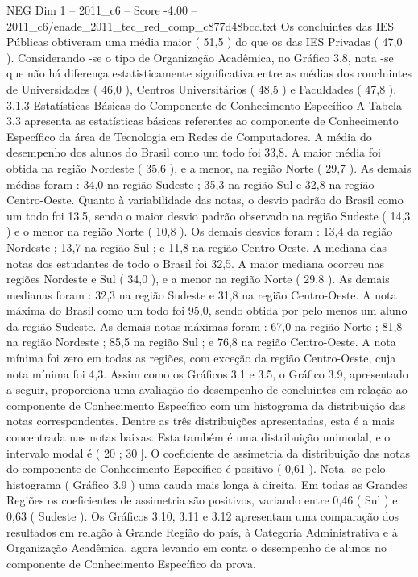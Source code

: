 \begin{textsample}{NEG Dim 1 – 2011\_c6 – Score -4.00 – 2011\_c6/enade\_2011\_tec\_red\_comp\_c877d48bcc.txt}
Os concluintes das IES Públicas obtiveram uma média maior ( 51,5 ) do que os das IES Privadas ( 47,0 ).
Considerando -se o tipo de Organização Acadêmica, no Gráfico 3.8, nota -se que não há diferença estatisticamente significativa entre as médias dos concluintes de Universidades ( 46,0 ), Centros Universitários ( 48,5 ) e Faculdades ( 47,8 ). 3.1.3 Estatísticas Básicas do Componente de Conhecimento Específico A Tabela 3.3 apresenta as estatísticas básicas referentes ao componente de Conhecimento Específico da área de Tecnologia em Redes de Computadores.
A média do desempenho dos alunos do Brasil como um todo foi 33,8.
A maior média foi obtida na região Nordeste ( 35,6 ), e a menor, na região Norte ( 29,7 ).
As demais médias foram : 34,0 na região Sudeste ; 35,3 na região Sul e 32,8 na região Centro-Oeste.
Quanto à variabilidade das notas, o desvio padrão do Brasil como um todo foi 13,5, sendo o maior desvio padrão observado na região Sudeste ( 14,3 ) e o menor na região Norte ( 10,8 ).
Os demais desvios foram : 13,4 da região Nordeste ; 13,7 na região Sul ; e 11,8 na região Centro-Oeste.
A mediana das notas dos estudantes de todo o Brasil foi 32,5.
A maior mediana ocorreu nas regiões Nordeste e Sul ( 34,0 ), e a menor na região Norte ( 29,8 ).
As demais medianas foram : 32,3 na região Sudeste e 31,8 na região Centro-Oeste.
A nota máxima do Brasil como um todo foi 95,0, sendo obtida por pelo menos um aluno da região Sudeste.
As demais notas máximas foram : 67,0 na região Norte ; 81,8 na região Nordeste ; 85,5 na região Sul ; e 76,8 na região Centro-Oeste.
A nota mínima foi zero em todas as regiões, com exceção da região Centro-Oeste, cuja nota mínima foi 4,3.
Assim como os Gráficos 3.1 e 3.5, o Gráfico 3.9, apresentado a seguir, proporciona uma avaliação do desempenho de concluintes em relação ao componente de Conhecimento Específico com um histograma da distribuição das notas correspondentes.
Dentre as três distribuições apresentadas, esta é a mais concentrada nas notas baixas.
Esta também é uma distribuição unimodal, e o intervalo modal é ( 20 ; 30 ].
O coeficiente de assimetria da distribuição das notas do componente de Conhecimento Específico é positivo ( 0,61 ).
Nota -se pelo histograma ( Gráfico 3.9 ) uma cauda mais longa à direita.
Em todas as Grandes Regiões os coeficientes de assimetria são positivos, variando entre 0,46 ( Sul ) e 0,63 ( Sudeste ).
Os Gráficos 3.10, 3.11 e 3.12 apresentam uma comparação dos resultados em relação à Grande Região do país, à Categoria Administrativa e à Organização Acadêmica, agora levando em conta o desempenho de alunos no componente de Conhecimento Específico da prova.

\end{textsample}
